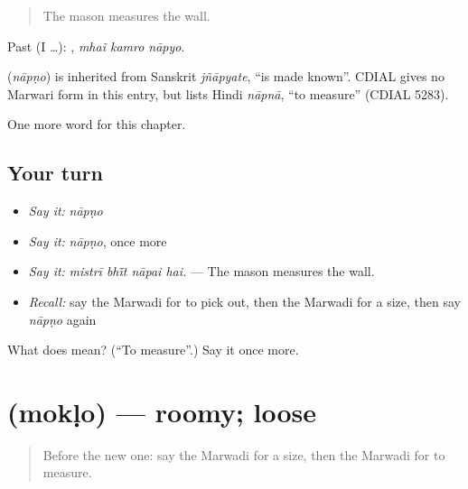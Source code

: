 \begin{quote}
The mason measures the wall.
\end{quote}

Past (I …):   , \emph{mhaĩ kamro nāpyo}.

\begin{cousinweb}
\textbf{} (\emph{nāpṇo}) is inherited from Sanskrit \emph{jñāpyate}, \textquotedblleft{}is made known\textquotedblright{}. CDIAL gives no Marwari form in this entry, but lists Hindi \emph{nāpnā}, \textquotedblleft{}to measure\textquotedblright{} (CDIAL 5283).
\end{cousinweb}

\begin{grammarlens}[title={What you've built}]
One more word for this chapter.
\end{grammarlens}

\subsection*{Your turn}
\begin{itemize}
\raggedright
  \item \emph{Say it:} \emph{nāpṇo}
  \item \emph{Say it:} \emph{nāpṇo}, once more
  \item \emph{Say it:} \emph{mistrī bhī̃t nāpai hai.} — The mason measures the wall.
  \item \emph{Recall:} say the Marwadi for to pick out, then the Marwadi for a size, then say \emph{nāpṇo} again
\end{itemize}

\begin{tcolorbox}[breakable,colback=teal!4,colframe=teal!35!black,title={Before you move on}]
What does  mean? (\textquotedblleft{}To measure\textquotedblright{}.) Say it once more.
\end{tcolorbox}
\section[\texorpdfstring{\mw{मोकळो} (mokḷo)}{मोकळो (mokḷo)}]{ (mokḷo) — roomy; loose}

\label{lesson:MW-C211-moklo}



\begin{quote}
Before the new one: say the Marwadi for a size, then the Marwadi for to measure.
\end{quote}

